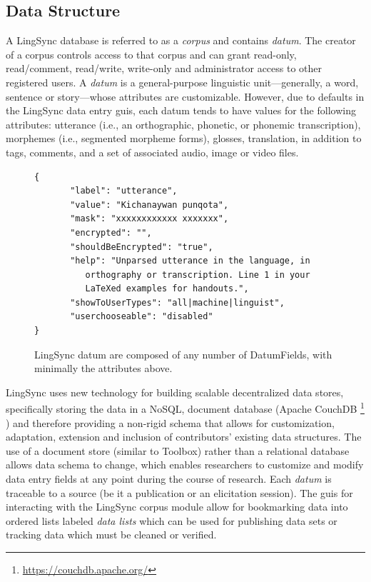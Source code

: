 \documentclass[11pt]{article}
\begin{document}
\subsection{Data Structure}

A LingSync database is referred to as a \emph{corpus} and contains
\textit{datum}. The creator of a corpus controls access to that corpus and can
grant read-only, read/comment, read/write, write-only and administrator access
to other registered users. A \emph{datum} is a general-purpose linguistic
unit---generally, a word, sentence or story---whose attributes are
customizable. However, due to defaults in the LingSync data entry \glspl{gui}, each
datum tends to have values for the following attributes: utterance (i.e., an
orthographic, phonetic, or phonemic transcription), morphemes (i.e., segmented
morpheme forms), glosses, translation, in addition to tags, comments, and a set
of associated audio, image or video files. 

\begin{figure}[h]
\scriptsize
\begin{verbatim}
{
       "label": "utterance",
       "value": "Kichanaywan punqota",
       "mask": "xxxxxxxxxxxx xxxxxxx",
       "encrypted": "",
       "shouldBeEncrypted": "true",
       "help": "Unparsed utterance in the language, in 
          orthography or transcription. Line 1 in your 
          LaTeXed examples for handouts.",
       "showToUserTypes": "all|machine|linguist",
       "userchooseable": "disabled"
}
\end{verbatim}

\caption{LingSync datum are composed of any number of DatumFields, with
minimally the attributes above.}
\label{lingsync-datastructure}
\end{figure}

LingSync uses new technology for building scalable decentralized data stores,
specifically storing the data in a NoSQL, document database (Apache CouchDB%
\footnote{\url{https://couchdb.apache.org/}}%
) and therefore providing a non-rigid schema that allows for customization,
adaptation, extension and inclusion of contributors' existing data structures.
The use of a document store (similar to Toolbox) rather than a relational
database allows data schema to change, which enables researchers to customize
and modify data entry fields at any point during the course of research. Each
\emph{datum} is traceable to a source (be it a publication or an elicitation
session). The \glspl{gui} for interacting with the LingSync corpus module allow for
bookmarking data into ordered lists labeled \textit{data lists} which can be
used for publishing data sets or tracking data which must be cleaned or
verified.
\end{document}
